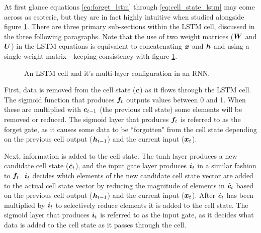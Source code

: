 At first glance equations \ref{eq:forget_lstm} through \ref{eq:cell_state_lstm} may come across as esoteric, but they are in fact highly intuitive when studied alongside figure \ref{fig:LSTM}.
There are three primary sub-sections within the LSTM cell, discussed in the three following paragraphs.
Note that the use of two weight matrices (${\bm{W}}$ and ${\bm{U}}$) in the LSTM equations is equivalent to concatenating ${\bm{x}}$ and ${\bm{h}}$ and using a single weight matrix - keeping consistency with figure \ref{fig:LSTM}.

\begin{figure}[htbp]
	\centering
	\quad\quad
	\caption{An LSTM cell and it's multi-layer configuration in an RNN.}
	\label{fig:LSTM}
\end{figure}

First, data is removed from the cell state (${\bm{c}}$) as it flows through the LSTM cell.
The sigmoid function that produces ${\bm{f}}_t$ outputs values between 0 and 1.
When these are multiplied with ${\bm{c}}_{t-1}$ (the previous cell state) some elements will be removed or reduced.
The sigmoid layer that produces ${\bm{f}}_t$ is referred to as the forget gate, as it causes some data to be ``forgotten" from the cell state depending on the previous cell output (${\bm{h}}_{t-1}$) and the current input (${\bm{x}}_t$).

Next, information is added to the cell state.
The tanh layer produces a new candidate cell state ($\hat{{\bm{c}}}_t$), and the input gate layer produces ${\bm{i}}_t$ in a similar fashion to ${\bm{f}}_t$.
${\bm{i}}_t$ decides which elements of the new candidate cell state vector are added to the actual cell state vector by reducing the magnitude of elements in $\hat{{\bm{c}}}_t$ based on the previous cell output (${\bm{h}}_{t-1}$) and the current input (${\bm{x}}_t$).
After $\hat{{\bm{c}}}_t$ has been multiplied by ${\bm{i}}_t$ to selectively reduce elements it is added to the cell state.
The sigmoid layer that produces ${\bm{i}}_t$ is referred to as the input gate, as it decides what data is added to the cell state as it passes through the cell.

